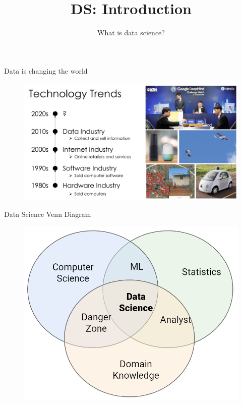 \documentclass[aspectratio=169]{../latex_main/tntbeamer}  %
\title[Introduction]{DS: Introduction}
\subtitle{What is data science?}
\begin{document}
	
	\maketitle

    \begin{frame}{Data is changing the world}
        \begin{figure}
            \centering
            \includegraphics[scale= .65]{bild1}
        \end{figure}
    \end{frame}


    \begin{frame}{Data Science Venn Diagram}
        \begin{figure}
            \centering
            \includegraphics[scale=.4]{bild3}
        \end{figure}
    \end{frame}
\end{document}
